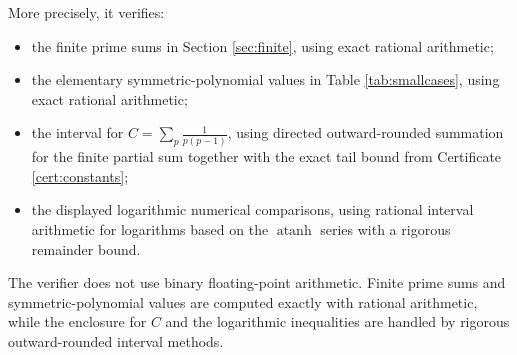 \documentclass[11pt]{article}
\numberwithin{equation}{section}
\theoremstyle{plain}
\theoremstyle{definition}
\theoremstyle{remark}
\begin{document}
More precisely, it verifies:
\begin{itemize}
\item the finite prime sums in Section \ref{sec:finite}, using exact rational arithmetic;
\item the elementary symmetric-polynomial values in Table \ref{tab:smallcases}, using exact rational arithmetic;
\item the interval for \(C=\sum_p \frac{1}{p(p-1)}\), using directed outward-rounded summation for the finite partial sum together with the exact tail bound from Certificate \ref{cert:constants};
\item the displayed logarithmic numerical comparisons, using rational interval arithmetic for logarithms based on the \(\operatorname{atanh}\) series with a rigorous remainder bound.
\end{itemize}

The verifier does not use binary floating-point arithmetic.  Finite prime sums and symmetric-polynomial values are computed exactly with rational arithmetic, while the enclosure for \(C\) and the logarithmic inequalities are handled by rigorous outward-rounded interval methods.
\end{document}
